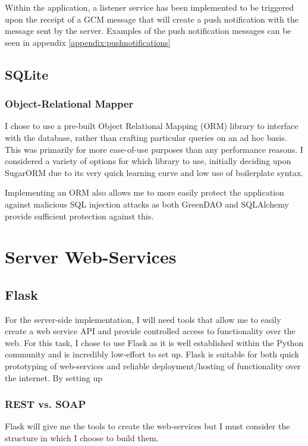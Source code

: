 Within the application, a listener service has been implemented to be triggered upon the receipt of a GCM message that will create a push notification with the message sent by the server.
Examples of the push notification messages can be seen in appendix \ref{appendix:pushnotifications}

\subsection{SQLite}

\subsubsection{Object-Relational Mapper}
I chose to use a pre-built Object Relational Mapping (ORM) library to interface with the database, rather than crafting particular queries on an ad hoc basis. 
This was primarily for more ease-of-use purposes than any performance reasons. 
I considered a variety of options for which library to use, initially deciding upon SugarORM due to its very quick learning curve and low use of boilerplate syntax. 


Implementing an ORM also allows me to more easily protect the application against malicious SQL injection attacks as both GreenDAO and SQLAlchemy provide sufficient protection against this. 


\section{Server Web-Services}
\subsection{Flask}
For the server-side implementation, I will need tools that allow me to easily create a web service API and provide controlled access to functionality over the web.
For this task, I chose to use Flask as it is well established within the Python community and is incredibly low-effort to set up. 
Flask is suitable for both quick prototyping of web-services and reliable deployment/hosting of functionality over the internet.
By setting up 

\subsubsection{REST vs. SOAP}
Flask will give me the tools to create the web-services but I must consider the structure in which I choose to build them. 

